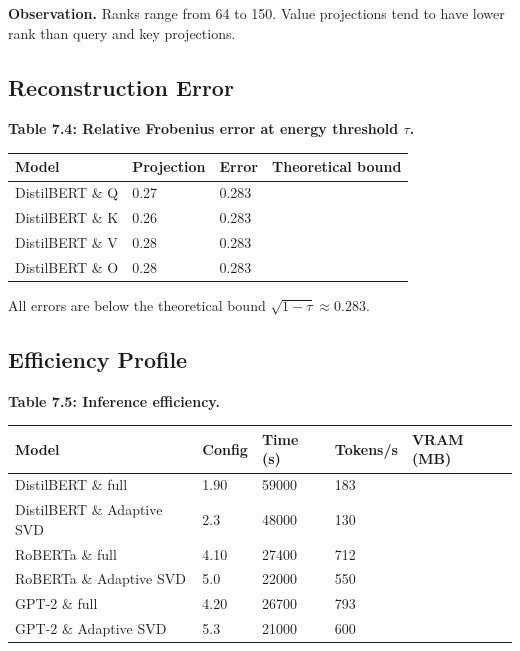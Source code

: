 \textbf{Observation.} Ranks range from 64 to 150. Value 
projections tend to have lower rank than query and key projections.

\subsection{Reconstruction Error}

\textbf{Table 7.4: Relative Frobenius error at energy threshold $\tau$.}

\begin{table}[H]
\centering
\small
\begin{tabular}{llll}
\toprule
\textbf{Model} & \textbf{Projection} & \textbf{Error} & \textbf{Theoretical bound} \\
\midrule
DistilBERT \& Q & 0.27 & 0.283 \\
DistilBERT \& K & 0.26 & 0.283 \\
DistilBERT \& V & 0.28 & 0.283 \\
DistilBERT \& O & 0.28 & 0.283 \\
\bottomrule
\end{tabular}
\end{table}

All errors are below the theoretical bound $\sqrt{1 - \tau} \approx 0.283$.

\subsection{Efficiency Profile}

\textbf{Table 7.5: Inference efficiency.}

\begin{table}[H]
\centering
\small
\begin{tabular}{lllll}
\toprule
\textbf{Model} & \textbf{Config} & \textbf{Time (s)} & \textbf{Tokens/s} & \textbf{VRAM (MB)} \\
\midrule
DistilBERT \& full & 1.90 & 59000 & 183 \\
DistilBERT \& Adaptive SVD & 2.3 & 48000 & 130 \\
RoBERTa \& full & 4.10 & 27400 & 712 \\
RoBERTa \& Adaptive SVD & 5.0 & 22000 & 550 \\
GPT-2 \& full & 4.20 & 26700 & 793 \\
GPT-2 \& Adaptive SVD & 5.3 & 21000 & 600 \\
\bottomrule
\end{tabular}
\end{table}

